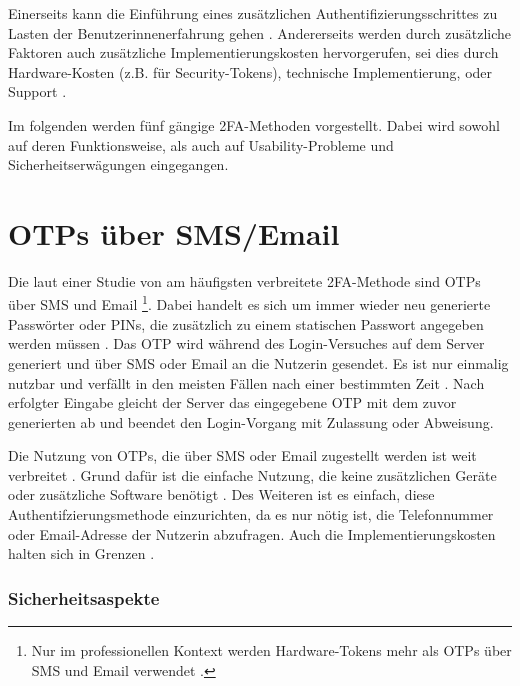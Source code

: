 Einerseits kann die Einführung eines zusätzlichen Authentifizierungsschrittes zu Lasten der Benutzerinnenerfahrung gehen \parencite{decristofaroComparativeUsability2014}. Andererseits werden durch zusätzliche Faktoren auch zusätzliche Implementierungskosten hervorgerufen, sei dies durch Hardware-Kosten (z.B. für Security-Tokens), technische Implementierung, oder Support \parencite{alsaleemMultiFactorAuthentication2021}.

\pskip
Im folgenden werden fünf gängige \ac{2FA}-Methoden vorgestellt. Dabei wird sowohl auf deren Funktionsweise, als auch auf Usability-Probleme und Sicherheitserwägungen eingegangen.

\section{OTPs über SMS/Email}
\label{sec:otp}

Die laut einer Studie von \citeyear{decristofaroComparativeUsability2014} am häufigsten verbreitete \ac{2FA}-Methode sind \acp{OTP} über SMS und Email \parencite{decristofaroComparativeUsability2014}\footnote{Nur im professionellen Kontext werden Hardware-Tokens mehr als \acp{OTP} über SMS und Email verwendet \parencite{decristofaroComparativeUsability2014}.}. Dabei handelt es sich um immer wieder neu generierte Passwörter oder PINs, die zusätzlich zu einem statischen Passwort angegeben werden müssen \parencite{geramiOneTimePasswords2016}. Das \ac{OTP} wird während des Login-Versuches auf dem Server generiert und über \acs{SMS} oder Email an die Nutzerin gesendet. Es ist nur einmalig nutzbar und verfällt in den meisten Fällen nach einer bestimmten Zeit \parencite{geramiOneTimePasswords2016}. Nach erfolgter Eingabe gleicht der Server das eingegebene \ac{OTP} mit dem zuvor generierten ab und beendet den Login-Vorgang mit Zulassung oder Abweisung.

Die Nutzung von \acp{OTP}, die über SMS oder Email zugestellt werden ist weit verbreitet \parencite{decristofaroComparativeUsability2014}. Grund dafür ist die einfache Nutzung, die keine zusätzlichen Geräte oder zusätzliche Software benötigt \parencite{abhishekComprehensiveStudy2013}. Des Weiteren ist es einfach, diese Authentifzierungsmethode einzurichten, da es nur nötig ist, die Telefonnummer oder Email-Adresse der Nutzerin abzufragen. Auch die Implementierungskosten halten sich in Grenzen \parencite{abhishekComprehensiveStudy2013}.

\subsubsection{Sicherheitsaspekte}

